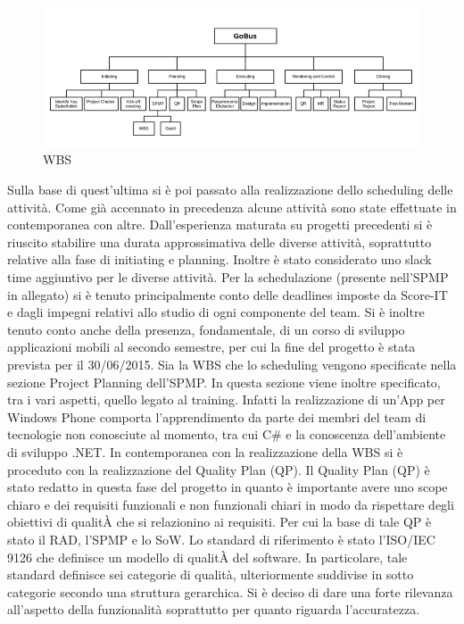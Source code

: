 \begin{figure}[tp]
\centering
\includegraphics[scale=.6]{img/6.png}
\caption{WBS}
\label{fig:cd}
\end{figure}

Sulla base di quest\rq ultima si \`{e} poi passato alla realizzazione dello scheduling delle attivit\`{a}.
Come gi\`{a} accennato in precedenza alcune attivit\`{a} sono state effettuate in contemporanea con altre. Dall\rq esperienza maturata su progetti precedenti si \`{e} riuscito stabilire una durata approssimativa delle diverse attivit\`{a}, soprattutto relative alla fase di initiating e planning.
Inoltre \`{e} stato considerato uno slack time aggiuntivo per le diverse attivit\`{a}.
Per la schedulazione (presente nell\rq SPMP in allegato) si \`{e} tenuto principalmente conto delle deadlines imposte da Score-IT e dagli impegni relativi allo studio di ogni componente del team.
Si \`{e} inoltre tenuto conto anche della presenza, fondamentale, di un corso di sviluppo applicazioni mobili al secondo semestre, per cui la fine del progetto \`{e} stata prevista per il 30/06/2015.
Sia la WBS che lo scheduling vengono specificate nella sezione Project Planning dell’SPMP. In questa sezione viene inoltre specificato, tra i vari aspetti, quello legato al training.
Infatti la realizzazione di un\rq App per Windows Phone comporta l\rq apprendimento da parte dei membri del team di tecnologie non conosciute al momento, tra cui C\# e la conoscenza dell\rq ambiente di sviluppo .NET. In contemporanea con la realizzazione della WBS si \`{e} proceduto con la realizzazione del Quality Plan (QP). Il Quality Plan (QP) \`{e} stato redatto in questa fase del progetto in quanto \`{e} importante avere uno scope chiaro e dei requisiti funzionali e non funzionali chiari in modo da rispettare degli obiettivi di qualit\`{A} che si relazionino ai requisiti. Per cui la base di tale QP \`{e} stato il RAD, l’SPMP e lo SoW.
Lo standard di riferimento \`{e} stato l’ISO/IEC 9126 che definisce un modello di qualit\`{A} del software. In particolare, tale standard definisce sei categorie di qualit\`{a}, ulteriormente suddivise in sotto categorie secondo una struttura gerarchica. Si \`{e} deciso di dare una forte rilevanza all\rq aspetto della funzionalit\`{a} soprattutto per quanto riguarda l\rq accuratezza.
